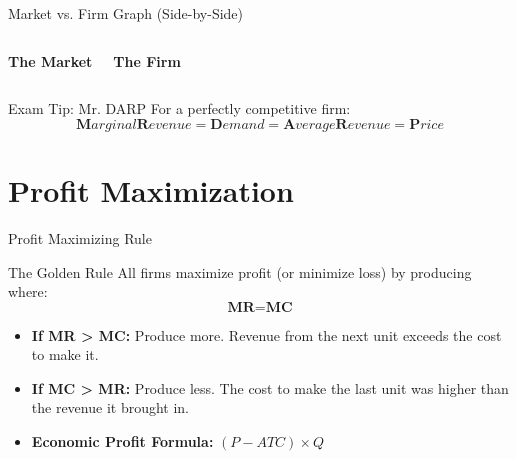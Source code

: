 \documentclass[aspectratio=169, 10pt]{beamer}
\begin{document}
\begin{frame}{Market vs. Firm Graph (Side-by-Side)}
    \begin{columns}
        \centering
        \textbf{The Market}
        
        \centering
        \textbf{The Firm}
    \end{columns}
    
    \vspace{0.5cm}
    \begin{alertblock}{Exam Tip: Mr. DARP}
    For a perfectly competitive firm:
    \[ \textbf{M}arginal \textbf{R}evenue = \textbf{D}emand = \textbf{A}verage \textbf{R}evenue = \textbf{P}rice \]
    \end{alertblock}
\end{frame}

\section{Profit Maximization}

\begin{frame}{Profit Maximizing Rule}
    \begin{block}{The Golden Rule}
    All firms maximize profit (or minimize loss) by producing where:
    \[ \textbf{MR} = \textbf{MC} \]
    \end{block}
    
    \begin{itemize}
        \item \textbf{If MR > MC:} Produce more. Revenue from the next unit exceeds the cost to make it.
        \item \textbf{If MC > MR:} Produce less. The cost to make the last unit was higher than the revenue it brought in.
        \item \textbf{Economic Profit Formula:} $(P - ATC) \times Q$
    \end{itemize}
\end{frame}
\end{document}
